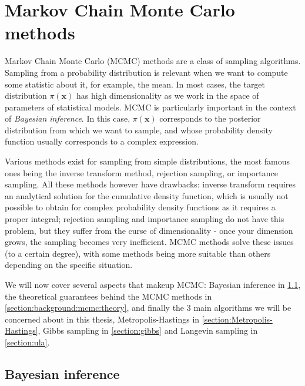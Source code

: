 \documentclass[12pt]{memoir}
\newcommand{\mb}{\mathbf}
\newcommand{\ti}{\textit}
\begin{document}

\newpage


\section{Markov Chain Monte Carlo methods}\label{section:mcmc-methods}

Markov Chain Monte Carlo (MCMC) methods are a class of sampling algorithms. Sampling from a probability distribution is relevant when we want to compute some statistic about it, for example, the mean. In most cases, the target distribution $\pi(\mb x)$ has high dimensionality as we work in the space of parameters of statistical models. MCMC is particularly important in the context of \ti{Bayesian inference}. In this case, $\pi(\mb x)$ corresponds to the posterior distribution from which we want to sample, and whose probability density function usually corresponds to a complex expression. \medbreak


Various methods exist for sampling from simple distributions, the most famous ones being the inverse transform method, rejection sampling, or importance sampling. All these methods however have drawbacks: inverse transform requires an analytical solution for the cumulative density function, which is usually not possible to obtain for complex probability density functions as it requires a proper integral; rejection sampling and importance sampling do not have this problem, but they suffer from the curse of dimensionality - once your dimension grows, the sampling becomes very inefficient. MCMC methods solve these issues (to a certain degree), with some methods being more suitable than others depending on the specific situation.\medbreak


We will now cover several aspects that makeup MCMC: Bayesian inference in \ref{section:background:mcmc:bayesian-inference}, the theoretical guarantees behind the MCMC methods in \ref{section:background:mcmc:theory}, and finally the 3 main algorithms we will be concerned about in this thesis, Metropolis-Hastings in \ref{section:Metropolis-Hastings}, Gibbs sampling in \ref{section:gibbs} and Langevin sampling in \ref{section:ula}.


\subsection{Bayesian inference}\label{section:background:mcmc:bayesian-inference}
\end{document}
